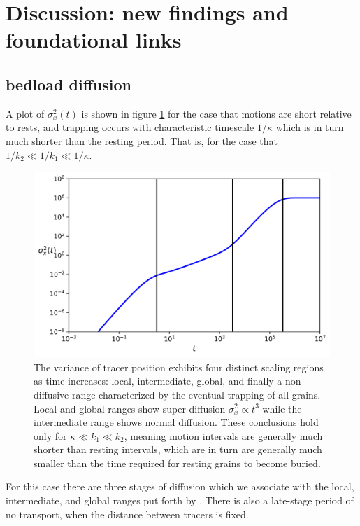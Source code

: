 \documentclass[]{agujournal2018}
\begin{document}
\section{Discussion: new findings and foundational links}
\label{sec:discussion}

\subsection{bedload diffusion}
A plot of $\sigma_x^2(t)$ is shown in figure \ref{fig:var} for the case that motions are short relative to rests, and trapping occurs with characteristic timescale $1/\kappa$ which is in turn much shorter than the resting period.
That is, for the case that $1/k_2 \ll 1/k_1 \ll 1/\kappa$.
\begin{figure}[t]
	\includegraphics[width=\linewidth,keepaspectratio]{./figures/diffusion.png}
	\caption{The variance of tracer position exhibits four distinct scaling regions as time increases: local, intermediate, global, and finally a non-diffusive range characterized by the eventual trapping of all grains.
	Local and global ranges show super-diffusion $\sigma_x^2 \propto t^3$ while the intermediate range shows normal diffusion. These conclusions hold only for $\kappa \ll k_1 \ll k_2$, meaning motion intervals are generally much shorter than resting intervals, which are in turn are generally much smaller than the time required for resting grains to become buried.}
	\label{fig:var}
\end{figure}
For this case there are three stages of diffusion which we associate with the local, intermediate, and global ranges put forth by \citet{Nikora2001a}. There is also a late-stage period of no transport, when the distance between tracers is fixed.
\end{document}

